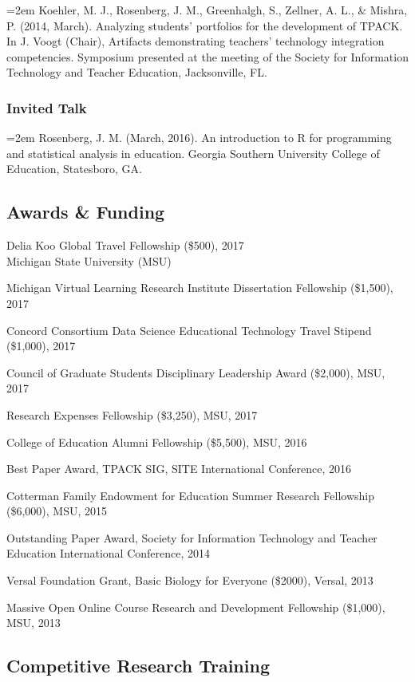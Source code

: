 \documentclass[]{article}
\begin{document}
\hangindent=2em Koehler, M. J., Rosenberg, J. M., Greenhalgh, S.,
Zellner, A. L., \& Mishra, P. (2014, March). Analyzing students'
portfolios for the development of TPACK. In J. Voogt (Chair), Artifacts
demonstrating teachers' technology integration competencies. Symposium
presented at the meeting of the Society for Information Technology and
Teacher Education, Jacksonville, FL.

\hypertarget{invited-talk}{%
\subsubsection{Invited Talk}\label{invited-talk}}

\hangindent=2em Rosenberg, J. M. (March, 2016). An introduction to R for
programming and statistical analysis in education. Georgia Southern
University College of Education, Statesboro, GA.

\hypertarget{awards-funding}{%
\subsection{Awards \& Funding}\label{awards-funding}}

Delia Koo Global Travel Fellowship (\$500), 2017\\
Michigan State University (MSU)

Michigan Virtual Learning Research Institute Dissertation Fellowship
(\$1,500), 2017

Concord Consortium Data Science Educational Technology Travel Stipend
(\$1,000), 2017

Council of Graduate Students Disciplinary Leadership Award (\$2,000),
MSU, 2017

Research Expenses Fellowship (\$3,250), MSU, 2017

College of Education Alumni Fellowship (\$5,500), MSU, 2016

Best Paper Award, TPACK SIG, SITE International Conference, 2016

Cotterman Family Endowment for Education Summer Research Fellowship
(\$6,000), MSU, 2015

Outstanding Paper Award, Society for Information Technology and Teacher
Education International Conference, 2014

Versal Foundation Grant, Basic Biology for Everyone (\$2000), Versal,
2013

Massive Open Online Course Research and Development Fellowship
(\$1,000), MSU, 2013

\hypertarget{competitive-research-training}{%
\subsection{Competitive Research
Training}\label{competitive-research-training}}
\end{document}
